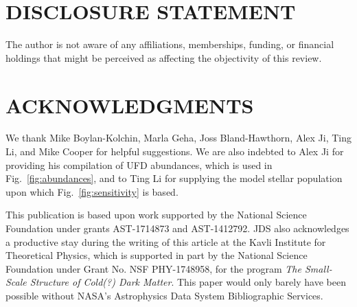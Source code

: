 \documentclass[a4paper]{ar-1col}
\begin{document}
\section*{DISCLOSURE STATEMENT}
The author is not aware of any affiliations, memberships, funding,
or financial holdings that might be perceived as affecting the
objectivity of this review.

\section*{ACKNOWLEDGMENTS}
We thank Mike Boylan-Kolchin, Marla Geha, Joss Bland-Hawthorn, Alex
Ji, Ting Li, and Mike Cooper for helpful suggestions.  We are also
indebted to Alex Ji for providing his compilation of UFD abundances,
which is used in Fig.~\ref{fig:abundances}, and to Ting Li for
supplying the model stellar population upon which
Fig.~\ref{fig:sensitivity} is based.

This publication is based upon work supported by the National Science
Foundation under grants AST-1714873 and AST-1412792.  JDS also
acknowledges a productive stay during the writing of this article at
the Kavli Institute for Theoretical Physics, which is supported in
part by the National Science Foundation under Grant No. NSF
PHY-1748958, for the program \emph{The Small-Scale Structure of
  Cold(?) Dark Matter}.  This paper would only barely have been
possible without NASA's Astrophysics Data System Bibliographic
Services.



\end{document}
